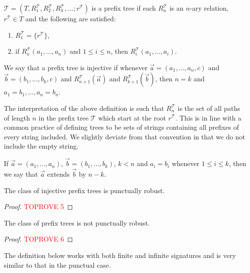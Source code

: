 \documentclass[a4paper,UKenglish,cleveref, autoref, thm-restate]{lipics-v2021}
\begin{document}
\begin{definition}
    $\mathcal{T}=(T,R_1^{\mathcal{T}},R_2^{\mathcal{T}},R_3^{\mathcal{T}},\dots;r^{\mathcal{T}})$ is a prefix tree if each $R_n^{\mathcal{T}}$ is an $n$-ary relation, $r^{\mathcal{T}} \in T$ and the following are satisfied:
    \begin{enumerate}
        \item $R_1^{\mathcal{T}}=\{r^{\mathcal{T}}\}$,
        \item if $R_n^{\mathcal{T}}(a_1,\dots,a_n)$ and $1 \leq i \leq n$, then $R_i^{\mathcal{T}}(a_1,\dots,a_i)$.
    \end{enumerate}
    We say that a prefix tree is injective if whenever $\vec{a}=(a_1,\dots,a_n,c)$ and $\vec{b}=(b_1,\dots,b_k,c)$ and $R_{n+1}^{\mathcal{T}}(\vec{a})$ and $R_{k+1}^{\mathcal{T}}(\vec{b})$, then $n=k$ and $a_1=b_1, \dots, a_n=b_n$.
\end{definition}

The interpretation of the above definition is such that $R_n^{\mathcal{T}}$ is the set of all paths of length $n$ in the prefix tree $\mathcal{T}$ which start at the root $r^{\mathcal{T}}$. This is in line with a common practice of defining trees to be sets of strings containing all prefixes of every string included. We  slightly deviate from that convention in that we do not include the empty string.

\begin{definition}
    If $\vec{a}=(a_1,\dots,a_n)$, $\vec{b}=(b_1,\dots,b_k)$, $k<n$ and $a_i=b_i$ whenever $1 \leq i \leq k$, then we say that $\vec{a}$ extends $\vec{b}$ by $n-k$.
\end{definition}

\begin{theorem}\label{pref}
    The class of injective prefix trees is punctually robust.
\end{theorem}


\begin{proof}\textcolor{red}{TOPROVE 5}\end{proof}

\begin{theorem}
    The class of prefix trees is not punctually robust.
\end{theorem}

\begin{proof}\textcolor{red}{TOPROVE 6}\end{proof}

The definition below works with both finite and infinite signatures and is very similar to that in the punctual case.
\end{document}
